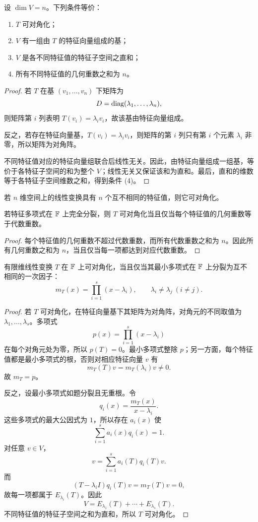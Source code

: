 \begin{theorem}[对角化的充要条件]
设 $\dim V=n$。下列条件等价：
\begin{enumerate}
\item $T$ 可对角化；
\item $V$ 有一组由 $T$ 的特征向量组成的基；
\item $V$ 是各不同特征值的特征子空间之直和；
\item 所有不同特征值的几何重数之和为 $n$。
\end{enumerate}
\end{theorem}
\begin{proof}
若 $T$ 在基 $(v_1,\ldots,v_n)$ 下矩阵为
\[
D=\operatorname{diag}(\lambda_1,\ldots,\lambda_n),
\]
则矩阵第 $i$ 列表明 $T(v_i)=\lambda_iv_i$，故该基由特征向量组成。

反之，若存在特征向量基，$T(v_i)=\lambda_iv_i$，则矩阵的第 $i$ 列只有第 $i$ 个元素 $\lambda_i$ 非零，所以矩阵为对角阵。

不同特征值对应的特征向量组联合后线性无关。因此，由特征向量组成一组基，等价于各特征子空间的和为整个 $V$；线性无关又保证该和为直和。最后，直和的维数等于各特征子空间维数之和，得到条件 (4)。
\end{proof}

\begin{corollary}[不同特征值保证可对角化]
若 $n$ 维空间上的线性变换具有 $n$ 个互不相同的特征值，则它可对角化。
\end{corollary}

\begin{corollary}[代数重数与几何重数判据]
若特征多项式在 $\mathbb{F}$ 上完全分裂，则 $T$ 可对角化当且仅当每个特征值的几何重数等于代数重数。
\end{corollary}
\begin{proof}
每个特征值的几何重数不超过代数重数，而所有代数重数之和为 $n$。因此所有几何重数之和为 $n$，当且仅当每一项都达到对应代数重数。
\end{proof}

\begin{theorem}[最小多项式的可对角化判据]
有限维线性变换 $T$ 在 $\mathbb{F}$ 上可对角化，当且仅当其最小多项式在 $\mathbb{F}$ 上分裂为互不相同的一次因子：
\[
m_T(x)=\prod_{i=1}^s(x-\lambda_i),
\qquad
\lambda_i\ne\lambda_j\ (i\ne j).
\]
\end{theorem}
\begin{proof}
若 $T$ 可对角化，在特征向量基下其矩阵为对角阵，对角元的不同取值为 $\lambda_1,\ldots,\lambda_s$。多项式
\[
p(x)=\prod_{i=1}^s(x-\lambda_i)
\]
在每个对角元处为零，所以 $p(T)=0$。最小多项式整除 $p$；另一方面，每个特征值都是最小多项式的根，否则对相应特征向量 $v$ 有
\[
m_T(T)v=m_T(\lambda_i)v\ne0.
\]
故 $m_T=p$。

反之，设最小多项式如题分裂且无重根。令
\[
q_i(x)=\frac{m_T(x)}{x-\lambda_i}.
\]
这些多项式的最大公因式为 $1$，所以存在 $a_i(x)$ 使
\[
\sum_{i=1}^s a_i(x)q_i(x)=1.
\]
对任意 $v\in V$，
\[
v=\sum_{i=1}^s a_i(T)q_i(T)v.
\]
而
\[
(T-\lambda_iI)q_i(T)v=m_T(T)v=0,
\]
故每一项都属于 $E_{\lambda_i}(T)$。因此
\[
V=E_{\lambda_1}(T)+\cdots+E_{\lambda_s}(T).
\]
不同特征值的特征子空间之和为直和，所以 $T$ 可对角化。
\end{proof}

